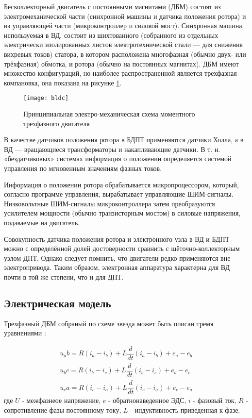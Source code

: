 Бесколлекторный двигатель с постоянными магнитами (ДБМ) состоят из электромеханической части (синхронной машины и датчика положения ротора) и из управляющей части (микроконтроллер и силовой мост). Синхронная машина, используемая в ВД, состоит из шихтованного (собранного из отдельных электрически изолированных листов электротехнической стали — для снижения вихревых токов) статора, в котором расположена многофазная (обычно двух- или трёхфазная) обмотка, и ротора (обычно на постоянных магнитах). ДБМ имеют множество конфигураций, но наиболее распространенной является трехфазная компановка, она показана на рисунке \ref{fig:BLDC}.

\begin{figure}[ht]
	\centering
	\texttt{[image: bldc]} 
	\caption{Принципиальная электро-механическая схема моментного трехфазного двигателя \cite[]{BLDC}}
	\label{fig:BLDC}
\end{figure}

В качестве датчиков положения ротора в БДПТ применяются датчики Холла, а в ВД — вращающиеся трансформаторы и накапливающие датчики. В т. н. «бездатчиковых» системах информация о положении определяется системой управления по мгновенным значениям фазных токов.

Информация о положении ротора обрабатывается микропроцессором, который, согласно программе управления, вырабатывает управляющие ШИМ-сигналы. Низковольтные ШИМ-сигналы микроконтроллера затем преобразуются усилителем мощности (обычно транзисторным мостом) в силовые напряжения, подаваемые на двигатель.

Совокупность датчика положения ротора и электронного узла в ВД и БДПТ можно с определённой долей достоверности сравнить с щёточно-коллекторным узлом ДПТ. Однако следует помнить, что двигатели редко применяются вне электропривода. Таким образом, электронная аппаратура характерна для ВД почти в той же степени, что и для ДПТ. \cite[]{BLDC}



\subsection{Электрическая модель} \label{sec:ch3/sec9/sub4}
Трехфазный ДБМ собраный по схеме звезда может быть описан тремя уравнениями \cite[]{BLDC_Stefan}:

\begin{equation}
\label{eq:p3:9.1}
\begin{alignedat}{2}
u_ab = R (i_a - i_b) + L \dfrac{d}{dt} (i_a - i_b) + e_a - e_b \\
u_bc = R (i_b - i_c) + L \dfrac{d}{dt} (i_b - i_c) + e_b - e_c \\
u_ca = R (i_c - i_a) + L \dfrac{d}{dt} (i_c - i_a) + e_c - e_a
\end{alignedat}
\end{equation}
где 
$U$ - межфазнеое напряжение, 
$e$ - обратнонаведенное ЭДС, 
$i$ - фазовый ток, 
$R$ - сопротивление фазы постоянному току, 
$L$ - индуктивность приведенная к фазе.

